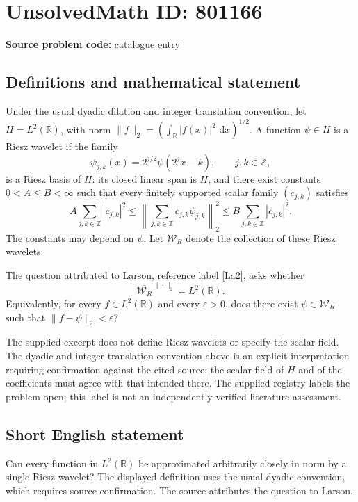 \documentclass[11pt]{article}
\newcommand{\Z}{\mathbb{Z}}
\newcommand{\R}{\mathbb{R}}
\newcommand{\dd}{\,\mathrm{d}}
\begin{document}
\section*{UnsolvedMath ID: 801166}
\textbf{Source problem code:} catalogue entry
\subsection{Definitions and mathematical statement}
Under the usual dyadic dilation and integer translation convention, let \(H=L^2(\R)\), with norm \(\|f\|_2=(\int_{\R}|f(x)|^2\,\dd x)^{1/2}\). A function \(\psi\in H\) is a Riesz wavelet if the family
\[
\psi_{j,k}(x)=2^{j/2}\psi(2^j x-k),\qquad j,k\in\Z,
\]
is a Riesz basis of \(H\): its closed linear span is \(H\), and there exist constants \(0<A\le B<\infty\) such that every finitely supported scalar family \((c_{j,k})\) satisfies
\[
A\sum_{j,k\in\Z}|c_{j,k}|^2
\le \left\|\sum_{j,k\in\Z}c_{j,k}\psi_{j,k}\right\|_2^2
\le B\sum_{j,k\in\Z}|c_{j,k}|^2.
\]
The constants may depend on \(\psi\). Let \(\mathcal W_R\) denote the collection of these Riesz wavelets.

The question attributed to Larson, reference label [La2], asks whether
\[
\overline{\mathcal W_R}^{\,\|\cdot\|_2}=L^2(\R).
\]
Equivalently, for every \(f\in L^2(\R)\) and every \(\varepsilon>0\), does there exist \(\psi\in\mathcal W_R\) such that \(\|f-\psi\|_2<\varepsilon\)?

The supplied excerpt does not define Riesz wavelets or specify the scalar field. The dyadic and integer translation convention above is an explicit interpretation requiring confirmation against the cited source; the scalar field of \(H\) and of the coefficients must agree with that intended there. The supplied registry labels the problem open; this label is not an independently verified literature assessment.
\subsection{Short English statement}
Can every function in \(L^2(\R)\) be approximated arbitrarily closely in norm by a single Riesz wavelet? The displayed definition uses the usual dyadic convention, which requires source confirmation. The source attributes the question to Larson.
\end{document}
